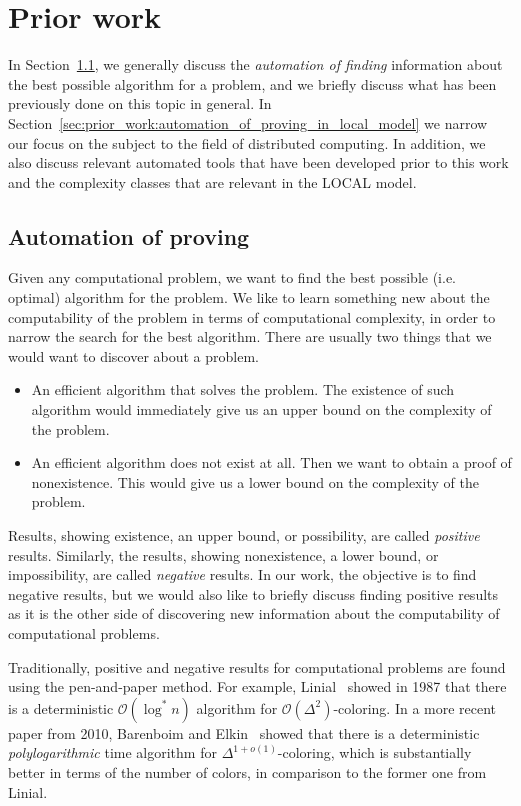 
\section{Prior work} \label{sec:prior_work}
In Section~\ref{sec:prior_work:automation_of_proving}, we generally discuss the \emph{automation of finding} information about the best possible algorithm for a problem, and we briefly discuss what has been previously done on this topic in general.
In Section~\ref{sec:prior_work:automation_of_proving_in_local_model} we narrow our focus on the subject to the field of distributed computing.
In addition, we also discuss relevant automated tools that have been developed prior to this work and the complexity classes that are relevant in the LOCAL model.

\subsection{Automation of proving} \label{sec:prior_work:automation_of_proving}
Given any computational problem, we want to find the best possible (i.e. optimal) algorithm for the problem.
We like to learn something new about the computability of the problem in terms of computational complexity, in order to narrow the search for the best algorithm.
There are usually two things that we would want to discover about a problem.
\begin{itemize}
    \item
    An efficient algorithm that solves the problem.
    The existence of such algorithm would immediately give us an upper bound on the complexity of the problem.
    \item
    An efficient algorithm does not exist at all.
    Then we want to obtain a proof of nonexistence.
    This would give us a lower bound on the complexity of the problem.
\end{itemize}
Results, showing existence, an upper bound, or possibility, are called \emph{positive} results.
Similarly, the results, showing nonexistence, a lower bound, or impossibility, are called \emph{negative} results.
In our work, the objective is to find negative results, but we would also like to briefly discuss finding positive results as it is the other side of discovering new information about the computability of computational problems.

Traditionally, positive and negative results for computational problems are found using the pen-and-paper method.
For example, Linial\ \cite{DBLP:conf/focs/Linial87} showed in 1987 that there is a deterministic \(\mathcal{O}(\log^* n)\) algorithm for \(\mathcal{O}(\Delta^2)\)-coloring.
In a more recent paper from 2010, Barenboim and Elkin\ \cite{DBLP:conf/podc/BarenboimE10} showed that there is a deterministic \emph{polylogarithmic} time algorithm for \(\Delta^{1 + o(1)}\)-coloring, which is substantially better in terms of the number of colors, in comparison to the former one \cite{DBLP:conf/focs/Linial87} from Linial.

